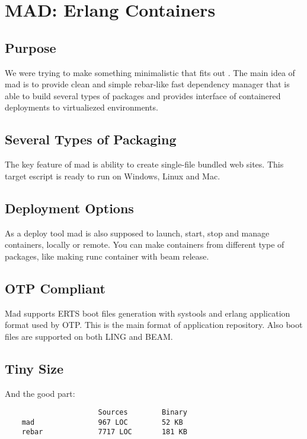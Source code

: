 \section{MAD: Erlang Containers}

\subsection{Purpose}
We were trying to make something minimalistic that fits out .
The main idea of mad is to provide clean and simple rebar-like fast dependency manager that
is able to build several types of packages and provides interface of containered deployments
to virtualiezed environments.

\subsection{Several Types of Packaging}
The key feature of mad is ability to create single-file bundled web sites.
This target escript is ready to run on Windows, Linux and Mac.

\subsection{Deployment Options}
As a deploy tool mad is also supposed to launch, start, stop and manage containers, locally or remote.
You can make containers from different type of packages, like making runc container with beam release.

\subsection{OTP Compliant}
Mad supports ERTS boot files generation with systools and erlang application format used by OTP.
This is the main format of application repository. Also boot files are supported on both LING and BEAM.

\subsection{Tiny Size}
And the good part:

\vspace{1\baselineskip}
\begin{lstlisting}
                      Sources        Binary
    mad               967 LOC        52 KB
    rebar             7717 LOC       181 KB
\end{lstlisting}
\vspace{1\baselineskip}

